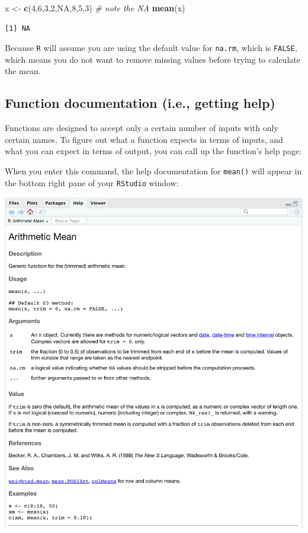 \documentclass[
]{book}
\newenvironment{Shaded}{\begin{snugshade}}{\end{snugshade}}
\newcommand{\CommentTok}[1]{\textcolor[rgb]{0.56,0.35,0.01}{\textit{#1}}}
\newcommand{\DecValTok}[1]{\textcolor[rgb]{0.00,0.00,0.81}{#1}}
\newcommand{\KeywordTok}[1]{\textcolor[rgb]{0.13,0.29,0.53}{\textbf{#1}}}
\newcommand{\NormalTok}[1]{#1}
\newcommand{\OtherTok}[1]{\textcolor[rgb]{0.56,0.35,0.01}{#1}}
\newcommand{\StringTok}[1]{\textcolor[rgb]{0.31,0.60,0.02}{#1}}
\begin{document}
\begin{Shaded}
\begin{Highlighting}[]
\NormalTok{x <-}\StringTok{ }\KeywordTok{c}\NormalTok{(}\DecValTok{4}\NormalTok{,}\DecValTok{6}\NormalTok{,}\DecValTok{3}\NormalTok{,}\DecValTok{2}\NormalTok{,}\OtherTok{NA}\NormalTok{,}\DecValTok{8}\NormalTok{,}\DecValTok{5}\NormalTok{,}\DecValTok{3}\NormalTok{)  }\CommentTok{# note the NA}
\KeywordTok{mean}\NormalTok{(x)}
\end{Highlighting}
\end{Shaded}

\begin{verbatim}
[1] NA
\end{verbatim}

Because \texttt{R} will assume you are using the default value for \texttt{na.rm}, which is \texttt{FALSE}, which means you do not want to remove missing values before trying to calculate the mean.

\hypertarget{function-documentation-i.e.-getting-help}{%
\subsection*{Function documentation (i.e., getting help)}\label{function-documentation-i.e.-getting-help}}

Functions are designed to accept only a certain number of inputs with only certain names. To figure out what a function expects in terms of inputs, and what you can expect in terms of output, you can call up the function's help page:

When you enter this command, the help documentation for \texttt{mean()} will appear in the bottom right pane of your \texttt{RStudio} window:

\includegraphics{img/functions_help.png}
\end{document}
